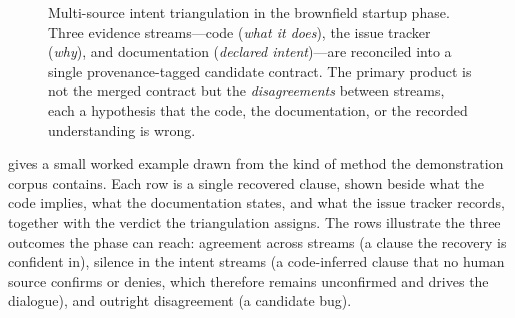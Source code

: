 \begin{figure}[t]
  \centering
  \caption{Multi-source intent triangulation in the brownfield startup phase. Three evidence streams---code (\emph{what it does}), the issue tracker (\emph{why}), and documentation (\emph{declared intent})---are reconciled into a single provenance-tagged candidate contract. The primary product is not the merged contract but the \emph{disagreements} between streams, each a hypothesis that the code, the documentation, or the recorded understanding is wrong.}
  \label{fig:triangulation}
\end{figure}

 gives a small worked example drawn from the kind of method the demonstration corpus contains. Each row is a single recovered clause, shown beside what the code implies, what the documentation states, and what the issue tracker records, together with the verdict the triangulation assigns. The rows illustrate the three outcomes the phase can reach: agreement across streams (a clause the recovery is confident in), silence in the intent streams (a code-inferred clause that no human source confirms or denies, which therefore remains unconfirmed and drives the dialogue), and outright disagreement (a candidate bug).

